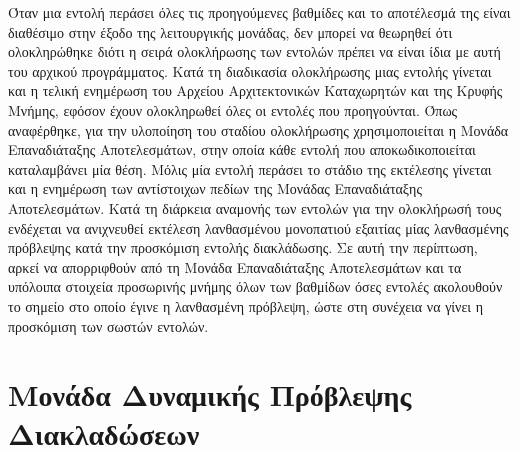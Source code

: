 Όταν μια εντολή περάσει όλες τις προηγούμενες βαθμίδες και το αποτέλεσμά της είναι διαθέσιμο στην έξοδο της λειτουργικής μονάδας, δεν μπορεί να θεωρηθεί ότι ολοκληρώθηκε διότι η σειρά ολοκλήρωσης των εντολών πρέπει να είναι ίδια με αυτή του αρχικού προγράμματος. Κατά τη διαδικασία ολοκλήρωσης μιας εντολής γίνεται και η τελική ενημέρωση του Αρχείου Αρχιτεκτονικών Καταχωρητών και της Κρυφής Μνήμης, εφόσον έχουν ολοκληρωθεί όλες οι εντολές που προηγούνται. Όπως αναφέρθηκε, για την υλοποίηση του σταδίου ολοκλήρωσης χρησιμοποιείται η Μονάδα Επαναδιάταξης Αποτελεσμάτων, στην οποία κάθε εντολή που αποκωδικοποιείται καταλαμβάνει μία θέση. Μόλις μία εντολή περάσει το στάδιο της εκτέλεσης γίνεται και η ενημέρωση των αντίστοιχων πεδίων της Μονάδας Επαναδιάταξης Αποτελεσμάτων. Κατά τη διάρκεια αναμονής των εντολών για την ολοκλήρωσή τους ενδέχεται να ανιχνευθεί εκτέλεση λανθασμένου μονοπατιού εξαιτίας μίας λανθασμένης πρόβλεψης κατά την προσκόμιση εντολής διακλάδωσης. Σε αυτή την περίπτωση, αρκεί να απορριφθούν από τη Μονάδα Επαναδιάταξης Αποτελεσμάτων και τα υπόλοιπα στοιχεία προσωρινής μνήμης όλων των βαθμίδων όσες εντολές ακολουθούν το σημείο στο οποίο έγινε η λανθασμένη πρόβλεψη, ώστε στη συνέχεια να γίνει η προσκόμιση των σωστών εντολών.


\section{Μονάδα Δυναμικής Πρόβλεψης Διακλαδώσεων}
\label{chap2_DynamicBranchPredictionUnit}

